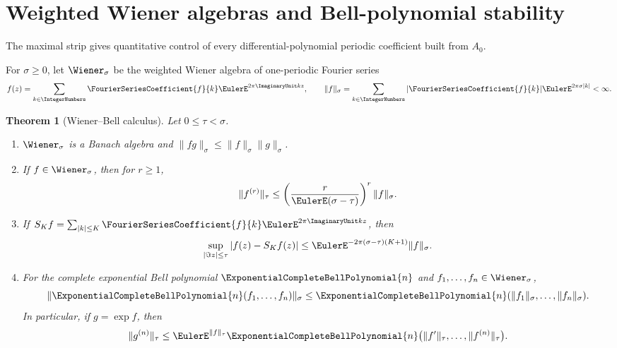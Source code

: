 \documentclass[11pt]{article}
\numberwithin{equation}{section}
\newtheorem{theorem}{Theorem}[section]
\theoremstyle{definition}
\theoremstyle{remark}
\begin{document}
\section{Weighted Wiener algebras and Bell-polynomial stability}
\label{p6:sec:wiener}

The maximal strip gives quantitative control of every differential-polynomial periodic
coefficient built from $A_0$.

\begin{definition}
For $\sigma\ge0$, let $\Wiener_\sigma$ be the weighted Wiener algebra of one-periodic
Fourier series
\[
 f(z)=\sum_{k\in\IntegerNumbers}\FourierSeriesCoefficient{f}{k}\EulerE^{2\pi\ImaginaryUnit kz},
 \qquad
 \|f\|_\sigma=\sum_{k\in\IntegerNumbers}|\FourierSeriesCoefficient{f}{k}|\EulerE^{2\pi\sigma|k|}<\infty.
\]
\end{definition}

\begin{theorem}[Wiener--Bell calculus]
\label{p6:thm:wiener-bell}
Let $0\le\tau<\sigma$.
\begin{enumerate}
\item $\Wiener_\sigma$ is a Banach algebra and
$\|fg\|_\sigma\le\|f\|_\sigma\|g\|_\sigma$.
\item If $f\in\Wiener_\sigma$, then for $r\ge1$,
\begin{equation}
 \|f^{(r)}\|_\tau
 \le\left(\frac{r}{\EulerE(\sigma-\tau)}\right)^r\|f\|_\sigma.
 \label{p6:eq:derivative-wiener}
\end{equation}
\item If $S_Kf=\sum_{|k|\le K}\FourierSeriesCoefficient{f}{k}\EulerE^{2\pi\ImaginaryUnit kz}$, then
\begin{equation}
 \sup_{|\Im z|\le\tau}|f(z)-S_Kf(z)|
 \le\EulerE^{-2\pi(\sigma-\tau)(K+1)}\|f\|_\sigma.
 \label{p6:eq:fourier-tail-wiener}
\end{equation}
\item For the complete exponential Bell polynomial $\ExponentialCompleteBellPolynomial{n}$ and
$f_1,\ldots,f_n\in\Wiener_\sigma$,
\begin{equation}
 \|\ExponentialCompleteBellPolynomial{n}(f_1,\ldots,f_n)\|_\sigma
 \le\ExponentialCompleteBellPolynomial{n}(\|f_1\|_\sigma,\ldots,\|f_n\|_\sigma).
 \label{p6:eq:bell-wiener}
\end{equation}
In particular, if $g=\exp f$, then
\begin{equation}
 \|g^{(n)}\|_\tau
 \le \EulerE^{\|f\|_\tau}
 \ExponentialCompleteBellPolynomial{n}\bigl(\|f'\|_\tau,\ldots,\|f^{(n)}\|_\tau\bigr).
 \label{p6:eq:exp-bell-bound}
\end{equation}
\end{enumerate}
\end{theorem}
\end{document}
